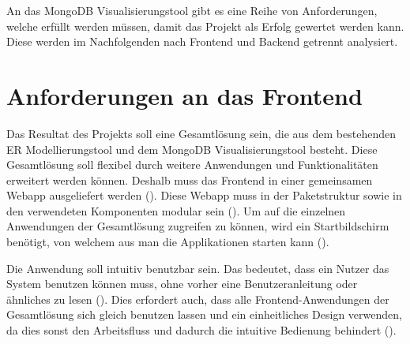 \iffalse
Die Analyse des zu lösenden Problems ist Grundlage für jedes 
ingenieurmäßige Vorgehen. Daher soll in diesem Kapitel das zu lösenden 
Problem auf Basis des im Grundlagenkapitel aufbereiteten Wissens 
analysiert werden. Hierzu ist insbesondere notwendig zu klären, wie sich 
das Gesamtproblem in Teilprobleme zerlegen lässt und welche 
Abhängigkeiten zwischen diesen bestehen.

Bei Software-Projekten befindet sich an dieser Stelle typischerweise die 
Anforderungsanalyse des \ac{rup}.

Anforderungen:
\begin{itemize}
    \item modular
    \item erweiterbar
    \item performant
\end{itemize}

\fi

An das MongoDB Visualisierungstool gibt es eine Reihe von Anforderungen, welche erfüllt werden müssen, damit das Projekt als Erfolg gewertet werden kann.
Diese werden im Nachfolgenden nach Frontend und Backend getrennt analysiert.

\section{Anforderungen an das Frontend}
\label{sec:anf_frontend}

Das Resultat des Projekts soll eine Gesamtlösung sein, die aus dem bestehenden ER Modellierungstool und dem MongoDB Visualisierungstool besteht. 
Diese Gesamtlösung soll flexibel durch weitere Anwendungen und Funktionalitäten erweitert werden können.
Deshalb muss das Frontend in einer gemeinsamen Webapp ausgeliefert werden ().
Diese Webapp muss in der Paketstruktur sowie in den verwendeten Komponenten modular sein ().
Um auf die einzelnen Anwendungen der Gesamtlösung zugreifen zu können, wird ein Startbildschirm benötigt, von welchem aus man die Applikationen starten kann (). 

Die Anwendung soll intuitiv benutzbar sein.
Das bedeutet, dass ein Nutzer das System benutzen können muss, ohne vorher eine Benutzeranleitung oder ähnliches zu lesen ().
Dies erfordert auch, dass alle Frontend-Anwendungen der Gesamtlösung sich gleich benutzen lassen und ein einheitliches Design verwenden, da dies sonst den Arbeitsfluss und dadurch die intuitive Bedienung behindert ().

